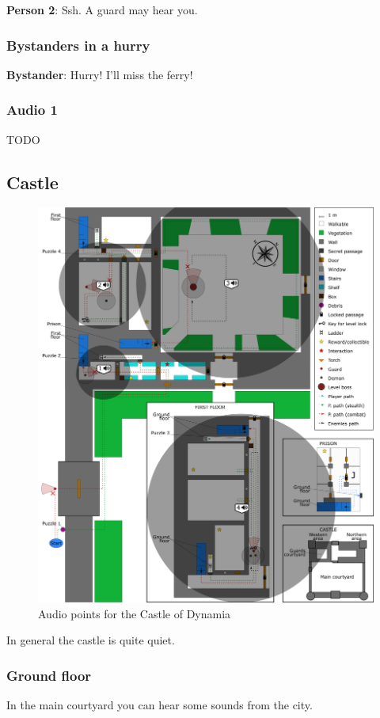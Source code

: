\textbf{Person 2}: Ssh. A guard may hear you.

\subsubsection*{Bystanders in a hurry}
\textbf{Bystander}: Hurry! I'll miss the ferry!

\subsubsection*{Audio 1}
TODO

\subsection{Castle}
\begin{figure}[H]
  \centering
  \includegraphics[width=\textwidth]{Images/Maps/castleOfDynamiaAudio}
  \caption{Audio points for the Castle of Dynamia}
\end{figure}

In general the castle is quite quiet.

\subsubsection*{Ground floor}
In the main courtyard you can hear some sounds from the city.

